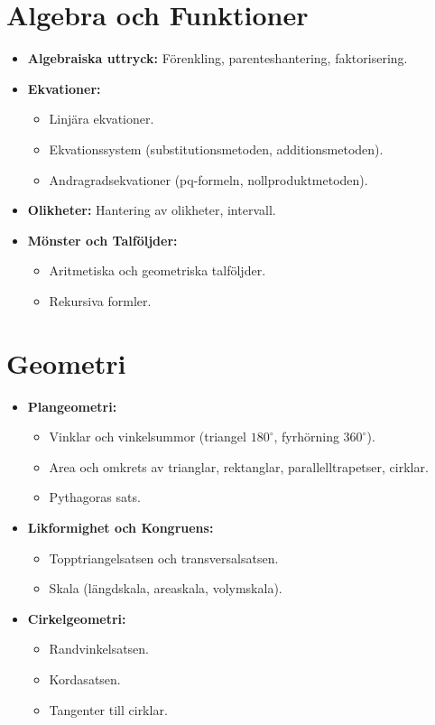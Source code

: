 \documentclass[11pt, a4paper]{article}
\begin{document}
\section{Algebra och Funktioner}
\begin{itemize}
    \item \textbf{Algebraiska uttryck:} Förenkling, parenteshantering, faktorisering.
    \item \textbf{Ekvationer:}
    \begin{itemize}
        \item Linjära ekvationer.
        \item Ekvationssystem (substitutionsmetoden, additionsmetoden).
        \item Andragradsekvationer (pq-formeln, nollproduktmetoden).
    \end{itemize}
    \item \textbf{Olikheter:} Hantering av olikheter, intervall.
    \item \textbf{Mönster och Talföljder:}
    \begin{itemize}
        \item Aritmetiska och geometriska talföljder.
        \item Rekursiva formler.
    \end{itemize}
\end{itemize}

\section{Geometri}
\begin{itemize}
    \item \textbf{Plangeometri:}
    \begin{itemize}
        \item Vinklar och vinkelsummor (triangel $180^\circ$, fyrhörning $360^\circ$).
        \item Area och omkrets av trianglar, rektanglar, parallelltrapetser, cirklar.
        \item Pythagoras sats.
    \end{itemize}
    \item \textbf{Likformighet och Kongruens:}
    \begin{itemize}
        \item Topptriangelsatsen och transversalsatsen.
        \item Skala (längdskala, areaskala, volymskala).
    \end{itemize}
    \item \textbf{Cirkelgeometri:}
    \begin{itemize}
        \item Randvinkelsatsen.
        \item Kordasatsen.
        \item Tangenter till cirklar.
    \end{itemize}
\end{itemize}
\end{document}

